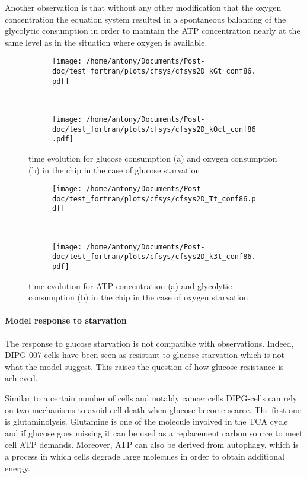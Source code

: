 \documentclass[11pt,a4paper]{article}
\begin{document}
Another observation is that without any other modification that the oxygen concentration the equation system resulted in a spontaneous balancing of the glycolytic consumption in order to maintain the ATP concentration nearly at the same level as in the situation where oxygen is available.

\begin{figure}[ht!]
	\begin{subfigure}{0.45\textwidth}
	\centering
	\texttt{[image: /home/antony/Documents/Post-doc/test\_fortran/plots/cfsys/cfsys2D\_kGt\_conf86.pdf]}
	\caption{ \label{kGt_conf86}}
	\end{subfigure}
	~~
	\begin{subfigure}{0.45\textwidth}
	\texttt{[image: /home/antony/Documents/Post-doc/test\_fortran/plots/cfsys/cfsys2D\_kOct\_conf86.pdf]}
		\caption{ \label{kOct_conf86}}
	\end{subfigure}
	\caption{time evolution for glucose consumption (a) and  oxygen consumption (b) in the chip in the case of glucose starvation \label{tconf86}}
\end{figure}

\begin{figure}[ht!]
	\begin{subfigure}{0.45\textwidth}
	\centering
	\texttt{[image: /home/antony/Documents/Post-doc/test\_fortran/plots/cfsys/cfsys2D\_Tt\_conf86.pdf]}
	\caption{ \label{Tt_conf86}}
	\end{subfigure}
	~~
	\begin{subfigure}{0.45\textwidth}
	\texttt{[image: /home/antony/Documents/Post-doc/test\_fortran/plots/cfsys/cfsys2D\_k3t\_conf86.pdf]}
		\caption{ \label{k3t_conf86}}
	\end{subfigure}
	\caption{time evolution for ATP concentration (a) and  glycolytic consumption (b) in the chip in the case of oxygen starvation \label{Btconf86}}
\end{figure}

\paragraph{Model response to starvation}
The response to glucose starvation is not compatible with observations. Indeed, DIPG-007 cells have been seen as resistant to glucose starvation which is not what the model suggest. This raises the question of how glucose resistance is achieved.

Similar to a certain number of cells and notably cancer cells DIPG-cells can rely on two mechanisms to avoid cell death when glucose become scarce. The first one is glutaminolysis. Glutamine is one of the molecule involved in the TCA cycle and if glucose goes missing it can be used as a replacement carbon source to meet cell ATP demands. Moreover, ATP can also be derived from autophagy, which is a process in which cells degrade large molecules in order to obtain additional energy.
\end{document}
